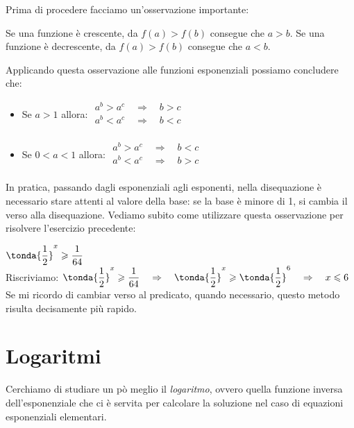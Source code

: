 Prima di procedere facciamo un'osservazione importante: 

\begin{osservazione}
Se una funzione è crescente, da \(f(a)>f(b)\) consegue che \(a>b\).
Se una funzione è decrescente, da \(f(a)>f(b)\) consegue che \(a<b\).
\end{osservazione}
Applicando questa osservazione alle funzioni esponenziali possiamo 
concludere che:

\begin{itemize}
 \item Se \(a>1\) allora: \quad \(\begin{matrix}
 a^b>a^c \quad \Rightarrow \quad b>c \\
 a^b<a^c \quad \Rightarrow \quad b<c \\
\end{matrix}\)
 \item Se \(0<a<1\) allora: \quad \(\begin{matrix}
 a^b>a^c \quad \Rightarrow \quad b<c \\
 a^b<a^c \quad \Rightarrow \quad b>c \\
\end{matrix}\)
\end{itemize}
In pratica, passando dagli esponenziali agli esponenti, nella disequazione 
è necessario stare attenti
al valore della base: se la base è minore di 1, si cambia il verso alla 
disequazione. 
Vediamo subito come utilizzare questa osservazione per risolvere 
l'esercizio precedente:


\begin{esempio}
 \(\tonda{\dfrac{1}{2}}^x \geqslant \dfrac{1}{64}\)\\[4pt]
 Riscriviamo:  \(\tonda{\dfrac{1}{2}}^x \geqslant \dfrac{1}{64} 
\quad\Rightarrow\quad
    \tonda{\dfrac{1}{2}}^x \geqslant \tonda{\dfrac{1}{2}}^6 
\quad\Rightarrow\quad 
    x \leqslant 6\)
\\[6pt]
Se mi ricordo di cambiar verso al predicato, quando necessario, questo 
metodo 
risulta decisamente più rapido.
\end{esempio}

\newpage %

\section{Logaritmi}
\label{sec:esplog_logaritmi}

Cerchiamo di studiare un pò meglio il \emph{logaritmo}, ovvero quella 
funzione inversa
dell'esponenziale che ci è servita per calcolare la soluzione nel caso di 
equazioni esponenziali elementari.

